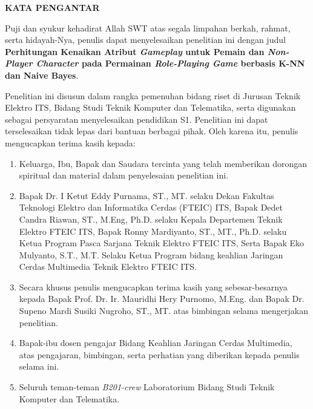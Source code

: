 \begin{center}
\large\textbf{KATA PENGANTAR}
\end{center}
\vspace{2ex}

\setlength{\parindent}{1cm} Puji dan syukur kehadirat Allah SWT atas segala limpahan berkah, rahmat, serta hidayah-Nya, penulis  dapat menyelesaikan penelitian ini dengan judul \textbf{Perhitungan Kenaikan Atribut \textit{Gameplay} untuk Pemain dan \textit{Non-Player Character} pada Permainan \textit{Role-Playing Game} berbasis K-NN dan Naive Bayes}.
\vspace{1ex}

Penelitian ini disusun dalam rangka pemenuhan bidang riset di Jurusan Teknik Elektro ITS, Bidang  Studi Teknik Komputer dan Telematika, serta digunakan sebagai persyaratan menyelesaikan pendidikan  S1. Penelitian ini dapat terselesaikan tidak lepas dari bantuan berbagai pihak. Oleh karena itu, penulis mengucapkan terima kasih kepada:
\vspace{1ex}

\begin{enumerate}[nolistsep]
	\item Keluarga, Ibu, Bapak dan Saudara tercinta yang telah memberikan dorongan spiritual dan material dalam penyelesaian penelitian ini.
	\vspace{1ex}
	\item Bapak Dr. I Ketut Eddy Purnama, ST., MT. selaku Dekan Fakultas Teknologi Elektro dan Informatika Cerdas (FTEIC) ITS, Bapak Dedet Candra Riawan, ST., M.Eng, Ph.D. selaku Kepala Departemen Teknik Elektro FTEIC ITS, Bapak Ronny Mardiyanto, ST., MT., Ph.D. selaku Ketua Program Pasca Sarjana Teknik Elektro FTEIC ITS, Serta Bapak Eko Mulyanto, S.T., M.T. Selaku Ketua Program bidang keahlian Jaringan Cerdas Multimedia Teknik Elektro FTEIC ITS.
	\vspace{1ex}
	\item Secara khusus penulis mengucapkan terima kasih yang sebesar-besarnya kepada Bapak Prof. Dr. Ir. Mauridhi Hery Purnomo, M.Eng. dan Bapak Dr. Supeno Mardi Susiki Nugroho, ST., MT. atas bimbingan selama mengerjakan  penelitian.
	\vspace{1ex}
	\item Bapak-ibu dosen pengajar Bidang Keahlian Jaringan Cerdas Multimedia, atas pengajaran,  bimbingan, serta perhatian yang diberikan kepada penulis selama ini.
	\vspace{1ex}
	\item Seluruh teman-teman \textit{B201-crew} Laboratorium Bidang Studi Teknik Komputer dan Telematika.
\end{enumerate}
\vspace{1ex}


